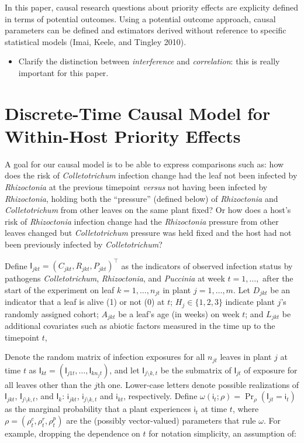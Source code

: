 \documentclass[]{article}
\providecommand{\tightlist}{%
  \setlength{\itemsep}{0pt}\setlength{\parskip}{0pt}}
\begin{document}
In this paper, causal research questions about priority effects are
explicity defined in terms of potential outcomes. Using a potential
outcome approach, causal parameters can be defined and estimators
derived without reference to specific statistical models (Imai, Keele,
and Tingley 2010).

\begin{itemize}
\tightlist
\item
  Clarify the distinction between \emph{interference} and
  \emph{correlation}: this is really important for this paper.
\end{itemize}

\section{Discrete-Time Causal Model for Within-Host Priority
Effects}\label{causal_model}

A goal for our causal model is to be able to express comparisons such
as: how does the risk of \emph{Colletotrichum} infection change had the
leaf not been infected by \emph{Rhizoctonia} at the previous timepoint
\emph{versus} not having been infected by \emph{Rhizoctonia}, holding
both the ``pressure'' (defined below) of \emph{Rhizoctonia} and
\emph{Colletotrichum} from other leaves on the same plant fixed? Or how
does a host's risk of \emph{Rhizoctonia} infection change had the
\emph{Rhizoctonia} pressure from other leaves changed but
\emph{Colletotrichum} pressure was held fixed and the host had not been
previously infected by \emph{Colletotrichum}?

Define \(\mathsf{I}_{jkt} = (C_{jkt}, R_{jkt}, P_{jkt})^\intercal\) as
the indicators of observed infection status by pathogens
\emph{Colletotrichum}, \emph{Rhizoctonia}, and \emph{Puccinia} at week
\(t = 1, \dots,\) after the start of the experiment on leaf
\(k = 1, \dots, n_{jt}\) in plant \(j = 1, \dots, m\). Let \(D_{jkt}\)
be an indicator that a leaf is alive (1) or not (0) at \(t\);
\(H_{j} \in \{1, 2, 3\}\) indicate plant \(j\)'s randomly assigned
cohort; \(A_{jkt}\) be a leaf's age (in weeks) on week \(t\); and
\(L_{jkt}\) be additional covariates such as abiotic factors measured in
the time up to the timepoint \(t\),

Denote the random matrix of infection exposures for all \(n_{jt}\)
leaves in plant \(j\) at time \(t\) as
\(\mathsf{I}_{kt} = (\mathsf{I}_{j1t} , \dots, \mathsf{I}_{kn_jt})\),
and let \(\mathsf{I}_{j \setminus k, t}\) be the submatrix of
\(\mathsf{I}_{jt}\) of exposure for all leaves other than the \(j\)th
one. Lower-case letters denote possible realizations of
\(\mathsf{I}_{jkt}\), \(\mathsf{I}_{j \setminus k, t}\), and
\(\mathsf{I}_{k}\): \(\mathsf{i}_{jkt}\),
\(\mathsf{i}_{j \setminus k, t}\) and \(\mathsf{i}_{kt}\), respectively.
Define
\(\omega(\mathsf{i}_{t}; \rho) = \Pr_{\rho}(\mathsf{I}_{jt} = \mathsf{i}_{t})\)
as the marginal probability that a plant experiences \(\mathsf{i}_t\) at
time \(t\), where \(\rho = (\rho^c_{t}, \rho^r_{t}, \rho^p_{t})\) are
the (possibly vector-valued) parameters that rule \(\omega\). For
example, dropping the dependence on \(t\) for notation simplicity, an
assumption of:
\end{document}
